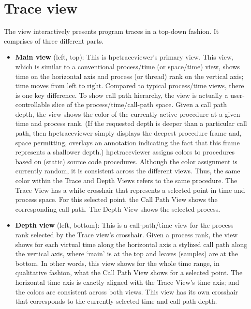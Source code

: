 \documentclass[english]{article}
\begin{document}


\section{Trace view}

The view interactively presents program traces in a top-down fashion. 
It comprises of three different parts. 


\begin{itemize}
\item \textbf{Main view} (left, top):
  This is hpctraceviewer's primary view.
  This view, which is similar to a conventional process/time (or space/time) view, shows time on the horizontal axis and process (or thread) rank on the vertical axis; time moves from left to right.
  Compared to typical process/time views, there is one key difference.
  To show call path hierarchy, the view is actually a user-controllable slice of the process/time/call-path space.
  Given a call path depth, the view shows the color of the currently active procedure at a given time and process rank.
  (If the requested depth is deeper than a particular call path, then hpctraceviewer simply displays the deepest procedure frame and, space permitting, overlays an annotation indicating the fact that this frame represents a shallower depth.)
  hpctraceviewer assigns colors to procedures based on (static) source code procedures.
  Although the color assignment is currently random, it is consistent across the different views.
  Thus, the same color within the Trace and Depth Views refers to the same procedure.
  The Trace View has a white crosshair that represents a selected point in time and process space.
  For this selected point, the Call Path View shows the corresponding call path.
  The Depth View shows the selected process.

\item \textbf{Depth view} (left, bottom):
  This is a call-path/time view for the process rank selected by the Trace view's crosshair.
  Given a process rank, the view shows for each virtual time along the horizontal axis a stylized call path along the vertical axis, where `main' is at the top and leaves (samples) are at the bottom.
  In other words, this view shows for the whole time range, in qualitative fashion, what the Call Path View shows for a selected point.
  The horizontal time axis is exactly aligned with the Trace View's time axis; and the colors are consistent across both views.
  This view has its own crosshair that corresponds to the currently selected time and call path depth.


\end{itemize}
\end{document}
